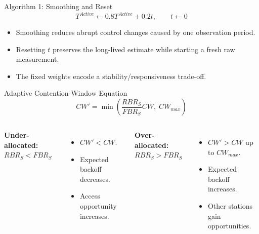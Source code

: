 \begin{frame}{Algorithm 1: Smoothing and Reset}
\[
\boxed{T^{Active}\leftarrow0.8T^{Active}+0.2t},\qquad
\boxed{t\leftarrow0}
\]
\begin{center}
\end{center}
\vspace{0.45cm}
\begin{itemize}
\item Smoothing reduces abrupt control changes caused by one observation period.
\item Resetting $t$ preserves the long-lived estimate while starting a fresh raw measurement.
\item The fixed weights encode a stability/responsiveness trade-off.
\end{itemize}
\end{frame}

\begin{frame}{Adaptive Contention-Window Equation}
\[
\boxed{CW'=\min\!\left(\frac{RBR_S}{FBR_S}CW,\;CW_{max}\right)}
\]
\begin{columns}[T,onlytextwidth]
\textbf{Under-allocated: $RBR_S<FBR_S$}
\begin{itemize}
\item $CW'<CW$.
\item Expected backoff decreases.
\item Access opportunity increases.
\end{itemize}
\textbf{Over-allocated: $RBR_S>FBR_S$}
\begin{itemize}
\item $CW'>CW$ up to $CW_{max}$.
\item Expected backoff increases.
\item Other stations gain opportunities.
\end{itemize}
\end{columns}
\end{frame}

